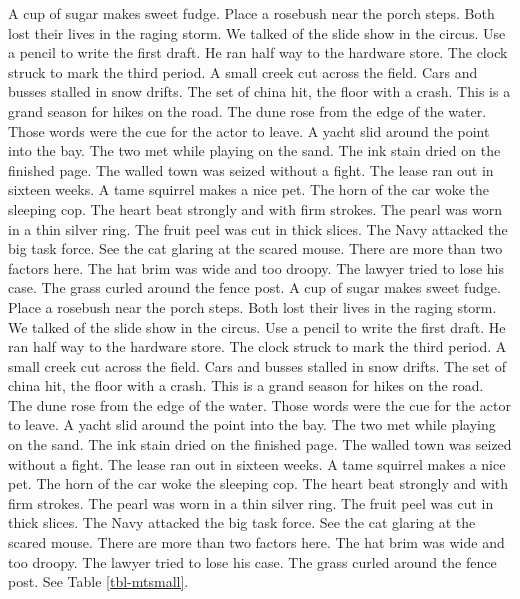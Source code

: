 \documentclass[
  letterpaper,
  DIV=11,
  numbers=noendperiod]{scrartcl}
\begin{document}
A cup of sugar makes sweet fudge. Place a rosebush near the porch steps.
Both lost their lives in the raging storm. We talked of the slide show
in the circus. Use a pencil to write the first draft. He ran half way to
the hardware store. The clock struck to mark the third period. A small
creek cut across the field. Cars and busses stalled in snow drifts. The
set of china hit, the floor with a crash. This is a grand season for
hikes on the road. The dune rose from the edge of the water. Those words
were the cue for the actor to leave. A yacht slid around the point into
the bay. The two met while playing on the sand. The ink stain dried on
the finished page. The walled town was seized without a fight. The lease
ran out in sixteen weeks. A tame squirrel makes a nice pet. The horn of
the car woke the sleeping cop. The heart beat strongly and with firm
strokes. The pearl was worn in a thin silver ring. The fruit peel was
cut in thick slices. The Navy attacked the big task force. See the cat
glaring at the scared mouse. There are more than two factors here. The
hat brim was wide and too droopy. The lawyer tried to lose his case. The
grass curled around the fence post. A cup of sugar makes sweet fudge.
Place a rosebush near the porch steps. Both lost their lives in the
raging storm. We talked of the slide show in the circus. Use a pencil to
write the first draft. He ran half way to the hardware store. The clock
struck to mark the third period. A small creek cut across the field.
Cars and busses stalled in snow drifts. The set of china hit, the floor
with a crash. This is a grand season for hikes on the road. The dune
rose from the edge of the water. Those words were the cue for the actor
to leave. A yacht slid around the point into the bay. The two met while
playing on the sand. The ink stain dried on the finished page. The
walled town was seized without a fight. The lease ran out in sixteen
weeks. A tame squirrel makes a nice pet. The horn of the car woke the
sleeping cop. The heart beat strongly and with firm strokes. The pearl
was worn in a thin silver ring. The fruit peel was cut in thick slices.
The Navy attacked the big task force. See the cat glaring at the scared
mouse. There are more than two factors here. The hat brim was wide and
too droopy. The lawyer tried to lose his case. The grass curled around
the fence post. See Table \ref{tbl-mtsmall}.
\end{document}
